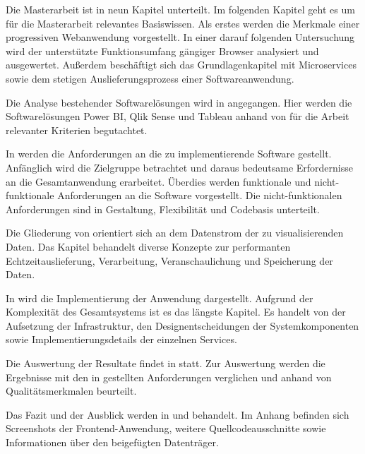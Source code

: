 Die Masterarbeit ist in neun Kapitel unterteilt. Im folgenden Kapitel geht es um für
die Masterarbeit relevantes Basiswissen. Als erstes werden die Merkmale einer progressiven
Webanwendung vorgestellt. In einer darauf folgenden Untersuchung wird der
unterstützte Funktionsumfang gängiger Browser analysiert und ausgewertet.
Außerdem beschäftigt sich das Grundlagenkapitel mit Microservices
sowie dem stetigen Auslieferungsprozess einer Softwareanwendung.

Die Analyse bestehender Softwarelösungen wird in 
angegangen. Hier werden die Softwarelösungen Power BI, Qlik Sense und Tableau anhand von für
die Arbeit relevanter Kriterien begutachtet.

In  werden die Anforderungen an die zu implementierende Software
gestellt. Anfänglich wird die Zielgruppe betrachtet und daraus bedeutsame Erfordernisse
an die Gesamtanwendung erarbeitet. Überdies werden funktionale und nicht-funktionale Anforderungen
an die Software vorgestellt. Die nicht-funktionalen Anforderungen sind in 
Gestaltung, Flexibilität und Codebasis unterteilt.

Die Gliederung von  orientiert sich an dem Datenstrom der zu visualisierenden
Daten. Das Kapitel behandelt diverse Konzepte zur performanten Echtzeitauslieferung, Verarbeitung,
Veranschaulichung und Speicherung der Daten.

In  wird die Implementierung der Anwendung dargestellt. Aufgrund der Komplexität
des Gesamtsystems ist es das längste Kapitel. Es handelt von der Aufsetzung der Infrastruktur, den Designentscheidungen
der Systemkomponenten sowie Implementierungsdetails der einzelnen Services.

Die Auswertung der Resultate findet in  statt. Zur Auswertung werden
die Ergebnisse mit den in  gestellten Anforderungen verglichen
und anhand von Qualitätsmerkmalen beurteilt.

Das Fazit und der Ausblick werden in  und  behandelt. Im Anhang befinden
sich Screenshots der Frontend-Anwendung, weitere Quellcodeausschnitte sowie Informationen
über den beigefügten Datenträger.
